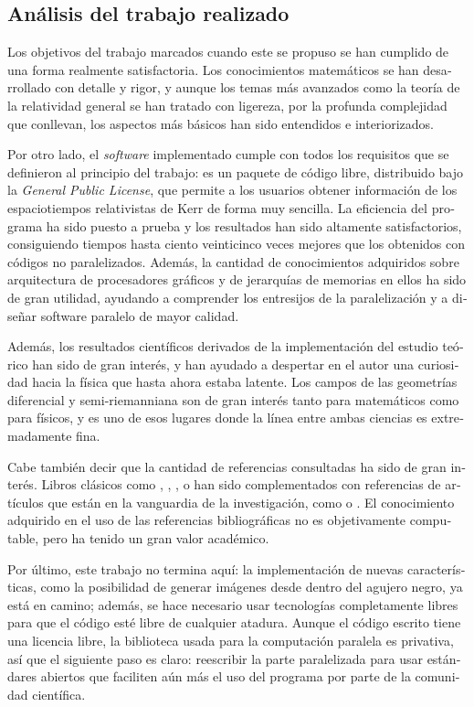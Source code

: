 \begin{otherlanguage}{spanish}
\section*{Análisis del trabajo realizado}

Los objetivos del trabajo marcados cuando este se propuso se han cumplido de una forma realmente satisfactoria. Los conocimientos matemáticos se han desarrollado con detalle y rigor, y aunque los temas más avanzados como la teoría de la relatividad general se han tratado con ligereza, por la profunda complejidad que conllevan, los aspectos más básicos han sido entendidos e interiorizados.

Por otro lado, el \emph{software} implementado cumple con todos los requisitos que se definieron al principio del trabajo: es un paquete de código libre, distribuido bajo la \emph{General Public License}, que permite a los usuarios obtener información de los espaciotiempos relativistas de Kerr de forma muy sencilla. La eficiencia del programa ha sido puesto a prueba y los resultados han sido altamente satisfactorios, consiguiendo tiempos hasta ciento veinticinco veces mejores que los obtenidos con códigos no paralelizados. Además, la cantidad de conocimientos adquiridos sobre arquitectura de procesadores gráficos y de jerarquías de memorias en ellos ha sido de gran utilidad, ayudando a comprender los entresijos de la paralelización y a diseñar software paralelo de mayor calidad.

Además, los resultados científicos derivados de la implementación del estudio teórico han sido de gran interés, y han ayudado a despertar en el autor una curiosidad hacia la física que hasta ahora estaba latente. Los campos de las geometrías diferencial y semi-riemanniana son de gran interés tanto para matemáticos como para físicos, y es uno de esos lugares donde la línea entre ambas ciencias es extremadamente fina.

Cabe también decir que la cantidad de referencias consultadas ha sido de gran interés. Libros clásicos como \cite{romero86}, \cite{oneill83}, \cite{docarmo79}, \cite{thorne73} o \cite{nomizu79} han sido complementados con referencias de artículos que están en la vanguardia de la investigación, como \cite{thorne15} o \cite{chan13}. El conocimiento adquirido en el uso de las referencias bibliográficas no es objetivamente computable, pero ha tenido un gran valor académico.

Por último, este trabajo no termina aquí: la implementación de nuevas características, como la posibilidad de generar imágenes desde dentro del agujero negro, ya está en camino; además, se hace necesario usar tecnologías completamente libres para que el código esté libre de cualquier atadura. Aunque el código escrito tiene una licencia libre, la biblioteca usada para la computación paralela es privativa, así que el siguiente paso es claro: reescribir la parte paralelizada para usar estándares abiertos que faciliten aún más el uso del programa por parte de la comunidad científica.

\end{otherlanguage}
\vfill

\endgroup
